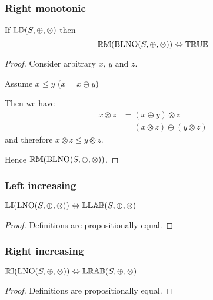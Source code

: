 \documentclass[../Summary.tex]{subfiles}
\begin{document}
\subsubsection{Right monotonic}

\begin{theorem} \label{thm:brno_left_monotonic}
If ${\mathbb{LD}}(S, \oplus, \otimes)$ then
\begin{equation*}
{\mathbb{RM}}(\mathrm{BLNO}(S,\oplus,\otimes)) \Leftrightarrow {\mathbb{TRUE}}
\end{equation*}
\end{theorem}

\begin{proof}

\vspace{0.5em}
Consider arbitrary $x$, $y$ and $z$.
\begin{ind}
Assume $x \leq y$ ($x = x \oplus y$)
\begin{ind}
Then we have
\begin{align*}
x \otimes z & = (x \oplus y) \otimes z \\
			& = (x \otimes z) \oplus (y \otimes z)
\end{align*}
and therefore $x \otimes z \leq y \otimes z$.
\end{ind}
\end{ind}
Hence ${\mathbb{RM}}(\mathrm{BLNO}(S,\oplus,\otimes))$.
\end{proof}




\subsubsection{Left increasing}

\begin{theorem} \label{thm:blno_left_increasing}
${\mathbb{LI}}(\mathrm{LNO}(S,\oplus,\otimes)) \Leftrightarrow {\mathbb{LLAB}}(S,\oplus,\otimes)$
\end{theorem}

\begin{proof}

\vspace{0.5em}
Definitions are propositionally equal.
\end{proof}





\subsubsection{Right increasing}

\begin{theorem} \label{thm:blno_right_increasing}
${\mathbb{RI}}(\mathrm{LNO}(S,\oplus,\otimes)) \Leftrightarrow {\mathbb{LRAB}}(S,\oplus,\otimes)$
\end{theorem}

\begin{proof}

\vspace{0.5em}
Definitions are propositionally equal.
\end{proof}
\end{document}
